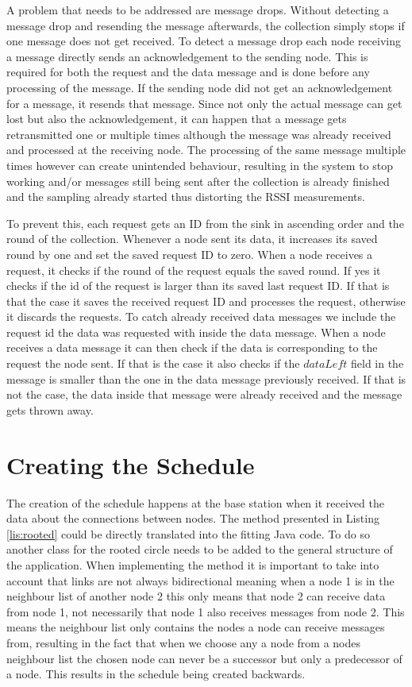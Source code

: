 A problem that needs to be addressed are message drops. Without detecting a message drop and resending the message afterwards, the collection simply stops if one message does not get received. To detect a message drop each node receiving a message directly sends an acknowledgement to the sending node. This is required for both the request and the data message and is done before any processing of the message. If the sending node did not get an acknowledgement for a message, it resends that message. Since not only the actual message can get lost but also the acknowledgement, it can happen that a message gets retransmitted one or multiple times although the message was already received and processed at the receiving node. The processing of the same message multiple times however can create unintended behaviour, resulting in the system to stop working and/or messages still being sent after the collection is already finished and the sampling already started thus distorting the RSSI measurements. 

To prevent this, each request gets an ID from the sink in ascending order and the round of the collection. Whenever a node sent its data, it increases its saved round by one and set the saved request ID to zero. When a node receives a request, it checks if the round of the request equals the saved round. If yes it checks if the id of the request is larger than its saved last request ID. If that is that the case it saves the received request ID and processes the request, otherwise it discards the requests. To catch already received data messages we include the request id the data was requested with inside the data message. When a node receives a data message it can then check if the data is corresponding to the request the node sent. If that is the case it also checks if the $dataLeft$ field in the message is smaller than the one in the data message previously received. If that is not the case, the data inside that message were already received and the message gets thrown away. 

\section{Creating the Schedule}
The creation of the schedule happens at the base station when it received the data about the connections between nodes. The method presented in Listing \ref{lis:rooted} could be directly translated into the fitting Java code. To do so another class for the rooted circle needs to be added to the general structure of the application. When implementing the method it is important to take into account that links are not always bidirectional meaning when a node 1 is in the neighbour list of another node 2 this only means that node 2 can receive data from node 1, not necessarily that node 1 also receives messages from node 2. This means the neighbour list only contains the nodes a node can receive messages from, resulting in the fact that when we choose any a node from a nodes neighbour list the chosen node can never be a successor but only a predecessor of a node. This results in the schedule being created backwards.

